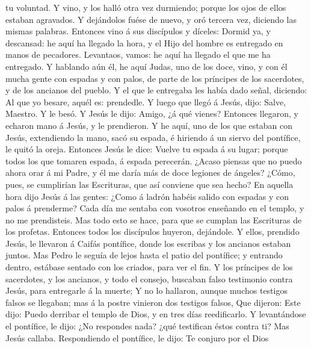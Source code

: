 tu voluntad.  Y vino, y los halló otra vez durmiendo;
porque los ojos de ellos estaban agravados.  Y dejándolos
fuése de nuevo, y oró tercera vez, diciendo las mismas palabras.
 Entonces vino á sus discípulos y díceles: Dormid ya, y
descansad: he aquí ha llegado la hora, y el Hijo del hombre es entregado
en manos de pecadores.  Levantaos, vamos: he aquí ha
llegado el que me ha entregado.  Y hablando aún él, he
aquí Judas, uno de los doce, vino, y con él mucha gente con espadas y
con palos, de parte de los príncipes de los sacerdotes, y de los
ancianos del pueblo.  Y el que le entregaba les había
dado señal, diciendo: Al que yo besare, aquél es: prendedle.
 Y luego que llegó á Jesús, dijo: Salve, Maestro. Y le
besó.  Y Jesús le dijo: Amigo, ¿á qué vienes? Entonces
llegaron, y echaron mano á Jesús, y le prendieron.  Y he
aquí, uno de los que estaban con Jesús, extendiendo la mano, sacó su
espada, é hiriendo á un siervo del pontífice, le quitó la oreja.
 Entonces Jesús le dice: Vuelve tu espada á su lugar;
porque todos los que tomaren espada, á espada perecerán. 
¿Acaso piensas que no puedo ahora orar á mi Padre, y él me daría más de
doce legiones de ángeles?  ¿Cómo, pues, se cumplirían las
Escrituras, que así conviene que sea hecho?  En aquella
hora dijo Jesús á las gentes: ¿Como á ladrón habéis salido con espadas y
con palos á prenderme? Cada día me sentaba con vosotros enseñando en el
templo, y no me prendisteis.  Mas todo esto se hace, para
que se cumplan las Escrituras de los profetas. Entonces todos los
discípulos huyeron, dejándole.  Y ellos, prendido Jesús,
le llevaron á Caifás pontífice, donde los escribas y los ancianos
estaban juntos.  Mas Pedro le seguía de lejos hasta el
patio del pontífice; y entrando dentro, estábase sentado con los
criados, para ver el fin.  Y los príncipes de los
sacerdotes, y los ancianos, y todo el consejo, buscaban falso testimonio
contra Jesús, para entregarle á la muerte;  Y no lo
hallaron, aunque muchos testigos falsos se llegaban; mas á la postre
vinieron dos testigos falsos,  Que dijeron: Este dijo:
Puedo derribar el templo de Dios, y en tres días reedificarlo.
 Y levantándose el pontífice, le dijo: ¿No respondes
nada? ¿qué testifican éstos contra ti?  Mas Jesús
callaba. Respondiendo el pontífice, le dijo: Te conjuro por el Dios
